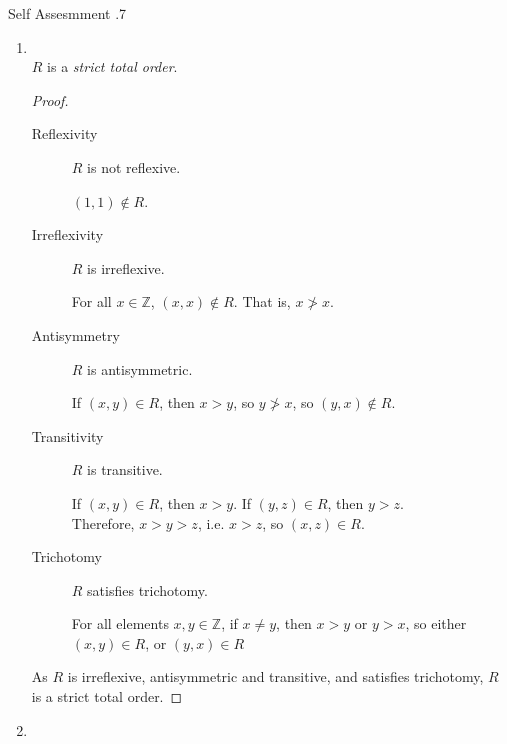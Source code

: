 \documentclass[\main/notes.tex]{subfiles}
\begin{document}
\begin{exercise}{Self Assesmment \thechapter.7}
\begin{enumerate}
\begin{proof}
								As $R$ is reflexive, antisymmetric and transitive, and satisfies trichotomy, $R$ is a weak total order.
							\end{proof}
						\item {}\\
							$R$ is a \emph{strict total order}.
							\begin{proof}
								$ $
								\begin{description}
									\item[Reflexivity] $R$ is not reflexive.
										\begin{subproof}[Counterexample]
											$(1, 1) \notin R$.
										\end{subproof}
									\item[Irreflexivity] $R$ is irreflexive.
										\begin{subproof}
											For all $x \in \mathbb{Z}$, $(x, x) \notin R$. That is, $x \not > x$.
										\end{subproof}
									\item[Antisymmetry] $R$ is antisymmetric.
										\begin{subproof}
											If $(x, y) \in R$, then $x > y$, so $y \not > x$, so $(y, x) \notin R$.
										\end{subproof}
									\item[Transitivity] $R$ is transitive.
										\begin{subproof}
											If $(x, y) \in R$, then $x > y$. If $(y, z) \in R$, then $y > z$.\\
											Therefore, $x > y > z$, i.e. $x > z$, so $(x, z) \in R$.
										\end{subproof}
									\item[Trichotomy] $R$ satisfies trichotomy.
										\begin{subproof}
											For all elements $x, y \in \mathbb{Z}$, if $x \neq y$, then $x > y$ or $y > x$, so either $(x, y) \in R$, or $(y, x) \in R$
										\end{subproof}
								\end{description}
								As $R$ is irreflexive, antisymmetric and transitive, and satisfies trichotomy, $R$ is a strict total order.
							\end{proof}
						\pagebreak
						\item {}\\

\end{enumerate}
\end{exercise}
\end{document}
